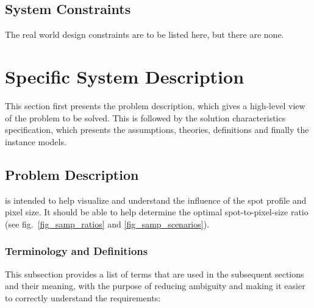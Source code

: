 \documentclass[12pt]{article}
\begin{document}
\subsection{System Constraints}

The real world design constraints are to be listed here, but there are none.

\section{Specific System Description}

This section first presents the problem description, which gives a high-level
view of the problem to be solved. This is followed by the solution characteristics
specification, which presents the assumptions, theories, definitions and finally
the instance models.

\subsection{Problem Description} \label{Sec_pd}

\progname{} is intended to help visualize and understand the influence of the 
spot profile and pixel size. It should be able to help determine the optimal 
spot-to-pixel-size ratio (see fig.~\ref{fig_samp_ratios} and \ref{fig_samp_scenarios}).

\subsubsection{Terminology and Definitions}

This subsection provides a list of terms that are used in the subsequent
sections and their meaning, with the purpose of reducing ambiguity and making it
easier to correctly understand the requirements:
\end{document}
